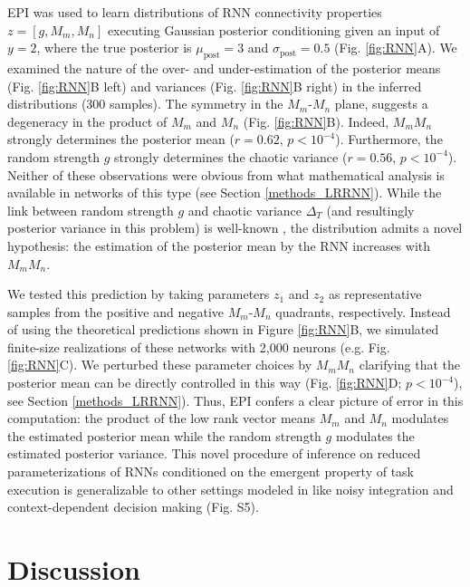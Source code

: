 \documentclass[11pt]{article}
\begin{document}
EPI was used to learn distributions of RNN connectivity properties $z = [g, M_m, M_n]$ executing Gaussian posterior conditioning given an input of $y=2$, where the true posterior is $\mu_{\text{post}}=3$ and $\sigma_{\text{post}} = 0.5$ (Fig. \ref{fig:RNN}A). 
We examined the nature of the over- and under-estimation of the posterior means (Fig. \ref{fig:RNN}B left) and variances (Fig. \ref{fig:RNN}B right) in the inferred distributions (300 samples).  
The symmetry in the $M_m$-$M_n$ plane, suggests a degeneracy in the product of $M_m$ and $M_n$ (Fig. \ref{fig:RNN}B).  
Indeed, $M_m M_n$ strongly determines the posterior mean ($r=0.62$,  $p<10^{-4}$). 
Furthermore, the random strength $g$ strongly determines the chaotic variance ($r=0.56$,  $p<10^{-4}$).
Neither of these observations were obvious from what mathematical analysis is available in networks of this type (see Section \ref{methods_LRRNN}).  
While the link between random strength $g$ and chaotic variance $\Delta_T$ (and resultingly posterior variance in this problem) is well-known \cite{sompolinsky1988chaos}, the distribution admits a novel hypothesis: the estimation of the posterior mean by the RNN increases with $M_m M_n$.

We tested this prediction by taking parameters $z_1$ and $z_2$ as representative samples from the positive and negative $M_m$-$M_n$ quadrants, respectively.
Instead of using the theoretical predictions shown in Figure \ref{fig:RNN}B, we simulated finite-size realizations of these networks with 2,000 neurons (e.g. Fig. \ref{fig:RNN}C).  
We perturbed these parameter choices by $M_m M_n$ clarifying that the posterior mean can be directly controlled in this way (Fig. \ref{fig:RNN}D; $p<10^{-4}$), see Section \ref{methods_LRRNN}).
Thus, EPI confers a clear picture of error in this computation: the product of the low rank vector means $M_m$ and $M_n$ modulates the estimated posterior mean while the random strength $g$ modulates the estimated posterior variance.
This novel procedure of inference on reduced parameterizations of RNNs conditioned on the emergent property of task execution is generalizable to other settings modeled in \cite{mastrogiuseppe2018linking} like noisy integration and context-dependent decision making (Fig. S5).

\section{Discussion}
\end{document}
